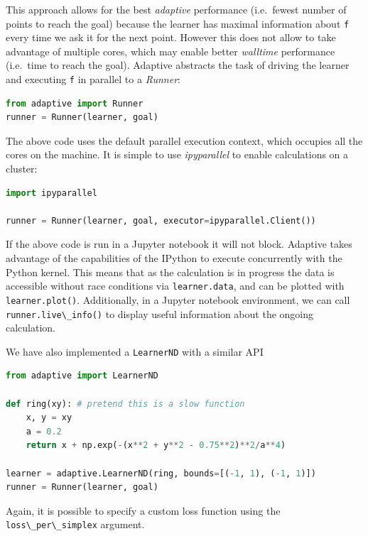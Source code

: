 \documentclass[english, twocolumn, 10pt, aps, superscriptaddress, floatfix, prb, citeautoscript]{revtex4-1}
\newcommand{\passthrough}[1]{\lstset{mathescape=false}#1\lstset{mathescape=true}}
\begin{document}
This approach allows for the best \emph{adaptive} performance (i.e.~fewest number of points to reach the goal) because the learner has maximal information about \passthrough{\lstinline!f!} every time we ask it for the next point.
However this does not allow to take advantage of multiple cores, which may enable better \emph{walltime} performance (i.e.~time to reach the goal).
Adaptive abstracts the task of driving the learner and executing \passthrough{\lstinline!f!} in parallel to a \emph{Runner}:

\begin{lstlisting}[language=Python]
from adaptive import Runner
runner = Runner(learner, goal)
\end{lstlisting}

The above code uses the default parallel execution context, which occupies all the cores on the machine.
It is simple to use \emph{ipyparallel} to enable calculations on a cluster:

\begin{lstlisting}[language=Python]
import ipyparallel

runner = Runner(learner, goal, executor=ipyparallel.Client())
\end{lstlisting}

If the above code is run in a Jupyter notebook it will not block.
Adaptive takes advantage of the capabilities of the IPython to execute concurrently with the Python kernel.
This means that as the calculation is in progress the data is accessible without race conditions via \passthrough{\lstinline!learner.data!}, and can be plotted with \passthrough{\lstinline!learner.plot()!}.
Additionally, in a Jupyter notebook environment, we can call \passthrough{\lstinline!runner.live\_info()!} to display useful information about the ongoing calculation.

We have also implemented a \passthrough{\lstinline!LearnerND!} with a similar API

\begin{lstlisting}[language=Python]
from adaptive import LearnerND

def ring(xy): # pretend this is a slow function
    x, y = xy
    a = 0.2
    return x + np.exp(-(x**2 + y**2 - 0.75**2)**2/a**4)

learner = adaptive.LearnerND(ring, bounds=[(-1, 1), (-1, 1)])
runner = Runner(learner, goal)
\end{lstlisting}

Again, it is possible to specify a custom loss function using the \passthrough{\lstinline!loss\_per\_simplex!} argument.
\end{document}
